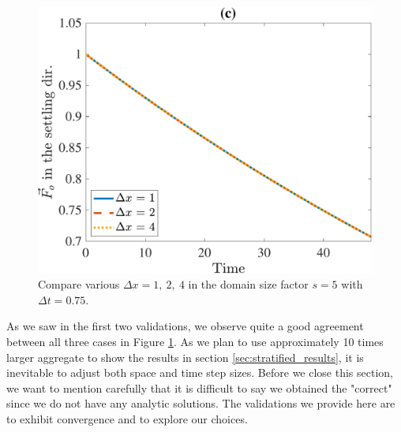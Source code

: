 \begin{figure}[ht]
\begin{center}
		\includegraphics[scale=0.25]{./figures/fig_NC10_dx_Fo3_all}
	\caption{Compare various $\Delta x = 1, \ 2, \ 4$ in the domain size factor $s = 5$ with $\Delta t = 0.75$.}
	\label{fig_NC10_compare_dx}
\end{center}
\end{figure}
As we saw in the first two validations, we observe quite a good agreement between all three cases in Figure \ref{fig_NC10_compare_dx}. As we plan to use approximately 10 times larger aggregate to show the results in section \ref{sec:stratified_results}, it is inevitable to adjust both space and time step sizes. 
Before we close this section, we want to mention carefully that it is difficult to say we obtained the "correct" since we do not have any analytic solutions. The validations we provide here are to exhibit convergence and to explore our choices.  

\clearpage
